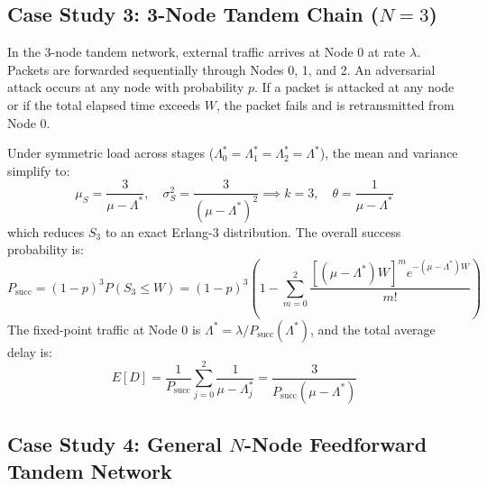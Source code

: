 \documentclass[12pt,onecolumn]{article}
\begin{document}
\subsection{Case Study 3: 3-Node Tandem Chain (\texorpdfstring{$N=3$}{N=3})}
In the 3-node tandem network, external traffic arrives at Node 0 at rate $\lambda$. Packets are forwarded sequentially through Nodes 0, 1, and 2. An adversarial attack occurs at any node with probability $p$. If a packet is attacked at any node or if the total elapsed time exceeds $W$, the packet fails and is retransmitted from Node 0.

Under symmetric load across stages ($\Lambda_0^* = \Lambda_1^* = \Lambda_2^* = \Lambda^*$), the mean and variance simplify to:
\begin{equation}
\mu_S = \frac{3}{\mu - \Lambda^*}, \quad \sigma_S^2 = \frac{3}{(\mu - \Lambda^*)^2} \implies k = 3, \quad \theta = \frac{1}{\mu - \Lambda^*}
\end{equation}
which reduces $S_3$ to an exact Erlang-3 distribution. The overall success probability is:
\begin{equation}
P_{\text{succ}} = (1 - p)^3 P(S_3 \le W) = (1 - p)^3 \left(1 - \sum_{m=0}^2 \frac{[(\mu - \Lambda^*)W]^m e^{-(\mu - \Lambda^*)W}}{m!}\right)
\end{equation}
The fixed-point traffic at Node 0 is $\Lambda^* = \lambda / P_{\text{succ}}(\Lambda^*)$, and the total average delay is:
\begin{equation}
E[D] = \frac{1}{P_{\text{succ}}} \sum_{j=0}^2 \frac{1}{\mu - \Lambda_j^*} = \frac{3}{P_{\text{succ}}(\mu - \Lambda^*)}
\end{equation}

\subsection{Case Study 4: General \texorpdfstring{$N$}{N}-Node Feedforward Tandem Network}
\end{document}
